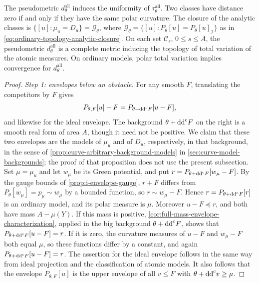 \begin{proposition}\label{prop:curve-all-obstacle-topology}
The pseudometric $d^{\mathrm{all}}_\theta$ induces the uniformity of $\tau^{\mathrm{all}}_\theta$. Two classes have distance zero if and only if they have the same polar curvature. The closure of the analytic classes is $\{[u]:\mu_u=D_u\}=\mathcal G_\theta$, where $\mathcal G_\theta=\{[u]:P_\theta[u]=P_\theta[u]_{\mathcal I}\}$ as in \eqref{eq:ordinary-topology-analytic-closure}. On each set $\mathcal C_s$, $0\leq s\leq A$, the pseudometric $d^{\mathrm{all}}_\theta$ is a complete metric inducing the topology of total variation of the atomic measures. On ordinary models, polar total variation implies convergence for $d^{\mathrm{all}}_\theta$.
\end{proposition}
\begin{proof}
\emph{Step 1: envelopes below an obstacle.} For any smooth $F$, translating the competitors by $F$ gives
\[
 P_{\theta,F}[u]-F=P_{\theta+\mathrm{dd}^{\mathrm{c}} F}[u-F],
\]
and likewise for the ideal envelope. The background $\theta+\mathrm{dd}^{\mathrm{c}} F$ on the right is a smooth real form of area $A$, though it need not be positive. We claim that these two envelopes are the models of $\mu_u$ and of $D_u$, respectively, in that background, in the sense of \cref{prop:curve-arbitrary-background-models} in \cref{sec:curve-model-backgrounds}; the proof of that proposition does not use the present subsection. Set $\mu=\mu_u$ and let $w_\mu$ be its Green potential, and put $r=P_{\theta+\mathrm{dd}^{\mathrm{c}} F}[w_\mu-F]$. By the gauge bounds of \cref{prop:i-envelope-gauge}, $r+F$ differs from $P_\theta[w_\mu]=p_\mu\sim w_\mu$ by a bounded function, so $r\sim w_\mu-F$. Hence $r=P_{\theta+\mathrm{dd}^{\mathrm{c}} F}[r]$ is an ordinary model, and its polar measure is $\mu$. Moreover $u-F\preceq r$, and both have mass $A-\mu(Y)$. If this mass is positive, \cref{cor:full-mass-envelope-characterization}, applied in the big background $\theta+\mathrm{dd}^{\mathrm{c}} F$, shows that $P_{\theta+\mathrm{dd}^{\mathrm{c}} F}[u-F]=r$. If it is zero, the curvature measures of $u-F$ and $w_\mu-F$ both equal $\mu$, so these functions differ by a constant, and again $P_{\theta+\mathrm{dd}^{\mathrm{c}} F}[u-F]=r$. The assertion for the ideal envelope follows in the same way from ideal projection and the classification of atomic models. It also follows that the envelope $P_{\theta,F}[u]$ is the upper envelope of all $v\leq F$ with $\theta+\mathrm{dd}^{\mathrm{c}} v\geq\mu$.


\end{proof}
